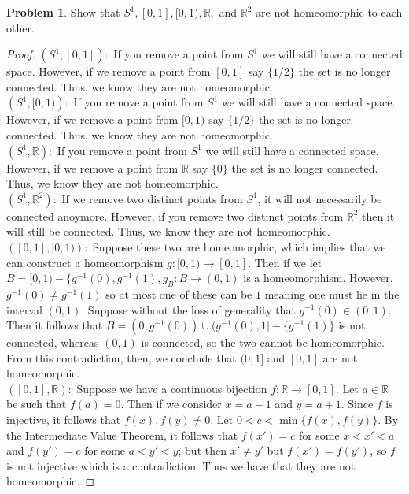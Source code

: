 \documentclass[11pt]{article}
\theoremstyle{definition}
\newtheorem{problem}{Problem}
\newcommand{\R}{\mathbb{R}}
\begin{document}
\pagebreak
\begin{problem}
    Show that $S^1, [0, 1], [0, 1), \R,$ and $\R^2$ are not homeomorphic to each other.
\end{problem}

\begin{proof}
    $\left(S^1, [0,1]\right):$ If you remove a point from $S^1$ we will still have a connected space. However, if we remove a point from $[0,1]$ say $\{1/2\}$ the set is no longer connected. Thus, we know they are not homeomorphic.
    \\
    $\left(S^1, [0,1)\right):$ If you remove a point from $S^1$ we will still have a connected space. However, if we remove a point from $[0,1)$ say $\{1/2\}$ the set is no longer connected. Thus, we know they are not homeomorphic.
    \\
    $\left(S^1, \R\right):$ If you remove a point from $S^1$ we will still have a connected space. However, if we remove a point from $\R$ say $\{0\}$ the set is no longer connected. Thus, we know they are not homeomorphic.
    \\
    $\left(S^1, \R^2\right):$ If we remove two distinct points from $S^1$, it will not necessarily be connected anoymore. However, if you remove two distinct points from $\R^2$ then it will still be connected. Thus, we know they are not homeomorphic.
    \\
    $\left([0,1], [0, 1)\right):$ Suppose these two are homeomorphic, which implies that we can construct a homeomorphism $g: [0, 1) \to [0, 1]$. Then if we let $B = [0, 1) - \{g^{-1}(0), g^{-1}(1), g_B: B\to (0, 1)$ is a homeomorphism. However, $g^{-1}(0) \neq g^{-1}(1)$ so at most one of these can be $1$ meaning one must lie in the interval $(0, 1)$. Suppose without the loss of generality that $g^{-1}(0)\in (0, 1).$ Then it follows that $B = (0, g^{-1}(0))\cup (g^{-1}(0),1]-\{g^{-1}(1)\}$ is not connected, whereas $(0,1)$ is connected, so the two cannot be homeomorphic. From this contradiction, then, we conclude that $(0, 1]$ and $[0,1]$ are not homeomorphic.
    \\
    $\left([0,1], \R\right):$ Suppose we have a continuous bijection $f: \R \to [0,1]$. Let $a \in \R$ be such that $f(a) = 0$. Then if we consider $x = a - 1$ and $y = a + 1$. Since $f$ is injective, it follows that $f(x),f(y) \neq 0$. Let $0 < c < \min\{f(x), f(y)\}$. By the Intermediate Value Theorem, it follows that $f(x') = c$ for some $x < x' < a$ and $f(y') = c$ for some $a < y' < y$; but then $x' \neq y'$ but $f(x') = f(y')$, so $f$ is not injective which is a contradiction. Thus we have that they are not homeomorphic.

\end{proof}
\end{document}
